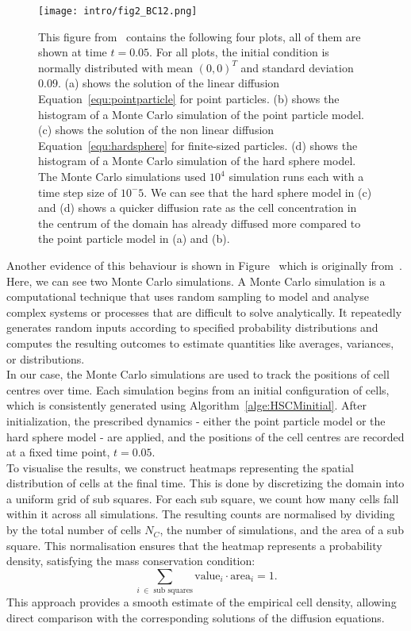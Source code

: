 \begin{figure}[h!]
	\centering
    \texttt{[image: intro/fig2\_BC12.png]}
    \caption{
    This figure from~\cite{Bruna2012} contains the following four plots, all of them are shown at time \( t=0.05 \). 
	For all plots, the initial condition is normally distributed with mean $(0,0)^T$ and standard deviation $0.09$. 
    (a) shows the solution of the linear diffusion Equation~\eqref{equ:pointparticle} for point particles. 
    (b) shows the histogram of a Monte Carlo simulation of the point particle model. 
    (c) shows the solution of the non linear diffusion Equation~\eqref{equ:hardsphere} for finite-sized particles. 
    (d) shows the histogram of a Monte Carlo simulation of the hard sphere model. 
    The Monte Carlo simulations used $10^4$ simulation runs each with a time step size of $10^-5$.
	We can see that the hard sphere model in (c) and (d) shows a quicker diffusion rate as the cell concentration in the centrum of the domain has already diffused more compared to the point particle model in (a) and (b). 
    }
    \label{fig:fig2BC12}
\end{figure}

Another evidence of this behaviour is shown in Figure~\cite{fig:fig2BC12} which is originally from~\cite{Bruna2012}. \\
Here, we can see two Monte Carlo simulations. 
A Monte Carlo simulation is a computational technique that uses random sampling to model and analyse complex systems or processes that are difficult to solve analytically. 
It repeatedly generates random inputs according to specified probability distributions and computes the resulting outcomes to estimate quantities like averages, variances, or distributions. \\
In our case, the Monte Carlo simulations are used to track the positions of cell centres over time. 
Each simulation begins from an initial configuration of cells, which is consistently generated using Algorithm~\ref{alge:HSCMinitial}. 
After initialization, the prescribed dynamics - either the point particle model or the hard sphere model - are applied, and the positions of the cell centres are recorded at a fixed time point, $t=0.05$. \\
To visualise the results, we construct heatmaps representing the spatial distribution of cells at the final time. 
This is done by discretizing the domain into a uniform grid of sub squares. 
For each sub square, we count how many cells fall within it across all simulations. 
The resulting counts are normalised by dividing by the total number of cells $N_C$, the number of simulations, and the area of a sub square. This normalisation ensures that the heatmap represents a probability density, satisfying the mass conservation condition: \[\sum\limits_{i \: \in \text{ sub squares}} \text{value}_i \cdot \text{area}_i = 1. \]
This approach provides a smooth estimate of the empirical cell density, allowing direct comparison with the corresponding solutions of the diffusion equations.


